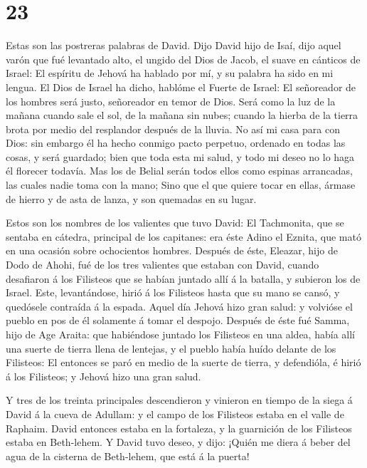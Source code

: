 \hypertarget{section-22}{%
\section{23}\label{section-22}}

 Estas son las postreras palabras de David. Dijo David hijo
de Isaí, dijo aquel varón que fué levantado alto, el ungido del Dios de
Jacob, el suave en cánticos de Israel:  El espíritu de
Jehová ha hablado por mí, y su palabra ha sido en mi lengua.
 El Dios de Israel ha dicho, hablóme el Fuerte de Israel: El
señoreador de los hombres será justo, señoreador en temor de Dios.
 Será como la luz de la mañana cuando sale el sol, de la
mañana sin nubes; cuando la hierba de la tierra brota por medio del
resplandor después de la lluvia.  No así mi casa para con
Dios: sin embargo él ha hecho conmigo pacto perpetuo, ordenado en todas
las cosas, y será guardado; bien que toda esta mi salud, y todo mi deseo
no lo haga él florecer todavía.  Mas los de Belial serán
todos ellos como espinas arrancadas, las cuales nadie toma con la mano;
 Sino que el que quiere tocar en ellas, ármase de hierro y
de asta de lanza, y son quemadas en su lugar.

 Estos son los nombres de los valientes que tuvo David: El
Tachmonita, que se sentaba en cátedra, principal de los capitanes: era
éste Adino el Eznita, que mató en una ocasión sobre ochocientos hombres.
 Después de éste, Eleazar, hijo de Dodo de Ahohi, fué de los
tres valientes que estaban con David, cuando desafiaron á los Filisteos
que se habían juntado allí á la batalla, y subieron los de Israel.
 Este, levantándose, hirió á los Filisteos hasta que su
mano se cansó, y quedósele contraída á la espada. Aquel día Jehová hizo
gran salud: y volvióse el pueblo en pos de él solamente á tomar el
despojo.  Después de éste fué Samma, hijo de Age Araita:
que habiéndose juntado los Filisteos en una aldea, había allí una suerte
de tierra llena de lentejas, y el pueblo había huído delante de los
Filisteos:  El entonces se paró en medio de la suerte de
tierra, y defendióla, é hirió á los Filisteos; y Jehová hizo una gran
salud.

 Y tres de los treinta principales descendieron y vinieron
en tiempo de la siega á David á la cueva de Adullam: y el campo de los
Filisteos estaba en el valle de Raphaim.  David entonces
estaba en la fortaleza, y la guarnición de los Filisteos estaba en
Beth-lehem.  Y David tuvo deseo, y dijo: ¡Quién me diera á
beber del agua de la cisterna de Beth-lehem, que está á la puerta!

